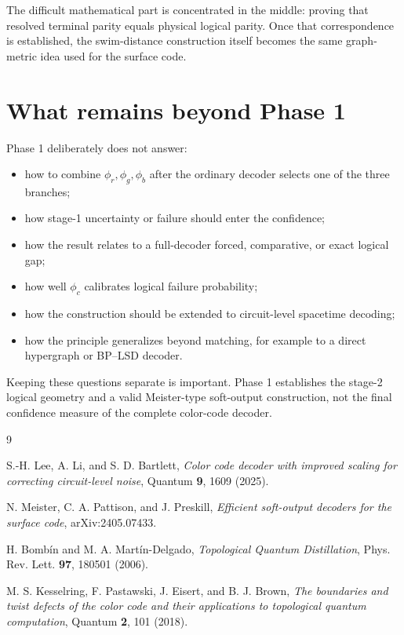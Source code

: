 \documentclass[11pt]{article}
\begin{document}
The difficult mathematical part is concentrated in the middle: proving that
resolved terminal parity equals physical logical parity. Once that
correspondence is established, the swim-distance construction itself becomes
the same graph-metric idea used for the surface code.

\section{What remains beyond Phase 1}

Phase 1 deliberately does not answer:
\begin{itemize}
  \item how to combine $\phi_r,\phi_g,\phi_b$ after the ordinary decoder
        selects one of the three branches;
  \item how stage-1 uncertainty or failure should enter the confidence;
  \item how the result relates to a full-decoder forced, comparative, or
        exact logical gap;
  \item how well $\phi_c$ calibrates logical failure probability;
  \item how the construction should be extended to circuit-level spacetime
        decoding;
  \item how the principle generalizes beyond matching, for example to a
        direct hypergraph or BP--LSD decoder.
\end{itemize}

Keeping these questions separate is important. Phase 1 establishes the
stage-2 logical geometry and a valid Meister-type soft-output construction,
not the final confidence measure of the complete color-code decoder.

\begin{thebibliography}{9}

S.-H. Lee, A. Li, and S. D. Bartlett,
\emph{Color code decoder with improved scaling for correcting circuit-level noise},
Quantum \textbf{9}, 1609 (2025).

N. Meister, C. A. Pattison, and J. Preskill,
\emph{Efficient soft-output decoders for the surface code},
arXiv:2405.07433.

H. Bomb\'in and M. A. Mart\'in-Delgado,
\emph{Topological Quantum Distillation},
Phys. Rev. Lett. \textbf{97}, 180501 (2006).

M. S. Kesselring, F. Pastawski, J. Eisert, and B. J. Brown,
\emph{The boundaries and twist defects of the color code and their applications to topological quantum computation},
Quantum \textbf{2}, 101 (2018).

\end{thebibliography}
\end{document}
